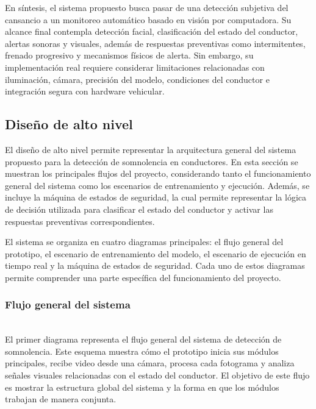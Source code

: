 \documentclass[conference]{IEEEtran}
\begin{document}
En síntesis, el sistema propuesto busca pasar de una detección subjetiva del cansancio a un monitoreo automático basado en visión por computadora. Su alcance final contempla detección facial, clasificación del estado del conductor, alertas sonoras y visuales, además de respuestas preventivas como intermitentes, frenado progresivo y mecanismos físicos de alerta. Sin embargo, su implementación real requiere considerar limitaciones relacionadas con iluminación, cámara, precisión del modelo, condiciones del conductor e integración segura con hardware vehicular.


\subsection{Diseño de alto nivel}

El diseño de alto nivel permite representar la arquitectura general del sistema propuesto para la detección de somnolencia en conductores. En esta sección se muestran los principales flujos del proyecto, considerando tanto el funcionamiento general del sistema como los escenarios de entrenamiento y ejecución. Además, se incluye la máquina de estados de seguridad, la cual permite representar la lógica de decisión utilizada para clasificar el estado del conductor y activar las respuestas preventivas correspondientes.

El sistema se organiza en cuatro diagramas principales: el flujo general del prototipo, el escenario de entrenamiento del modelo, el escenario de ejecución en tiempo real y la máquina de estados de seguridad. Cada uno de estos diagramas permite comprender una parte específica del funcionamiento del proyecto.\\


\subsubsection{Flujo general del sistema}\mbox{}\\

El primer diagrama representa el flujo general del sistema de detección de somnolencia. Este esquema muestra cómo el prototipo inicia sus módulos principales, recibe video desde una cámara, procesa cada fotograma y analiza señales visuales relacionadas con el estado del conductor. El objetivo de este flujo es mostrar la estructura global del sistema y la forma en que los módulos trabajan de manera conjunta.
\end{document}
